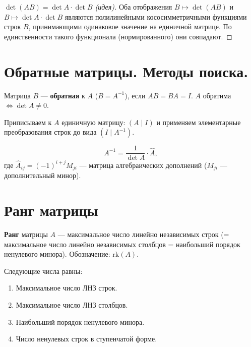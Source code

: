 \documentclass[12pt]{article}
\begin{document}
\begin{proof}[$\det(AB)=\det A \cdot \det B$ (идея)]
Оба отображения $B \mapsto \det(AB)$ и $B \mapsto \det A \cdot \det B$
являются полилинейными кососимметричными функциями строк $B$,
принимающими одинаковое значение на единичной матрице.
По единственности такого функционала (нормированного) они совпадают.
\end{proof}

\section{Обратные матрицы. Методы поиска.}

\begin{definition}
Матрица $B$ --- \textbf{обратная} к $A$ ($B = A^{-1}$), если
$AB = BA = I$.
$A$ обратима $\iff \det A \neq 0$.
\end{definition}

\begin{method}
Приписываем к $A$ единичную матрицу: $(A \mid I)$ и применяем
элементарные преобразования строк до вида $(I \mid A^{-1})$.
\end{method}

\begin{method}
\[
A^{-1} = \frac{1}{\det A} \cdot \hat{A},
\]
где $\hat{A}_{ij} = (-1)^{i+j} M_{ji}$ --- матрица алгебраических
дополнений ($M_{ji}$ --- дополнительный минор).
\end{method}

\section{Ранг матрицы}

\begin{definition}
\textbf{Ранг} матрицы $A$ --- максимальное число линейно независимых
строк (= максимальное число линейно независимых столбцов =
наибольший порядок ненулевого минора). Обозначение: $\mathrm{rk}(A)$.
\end{definition}

\begin{theorem}
Следующие числа равны:
\begin{enumerate}[(1)]
\item Максимальное число ЛНЗ строк.
\item Максимальное число ЛНЗ столбцов.
\item Наибольший порядок ненулевого минора.
\item Число ненулевых строк в ступенчатой форме.
\end{enumerate}
\end{theorem}
\end{document}
